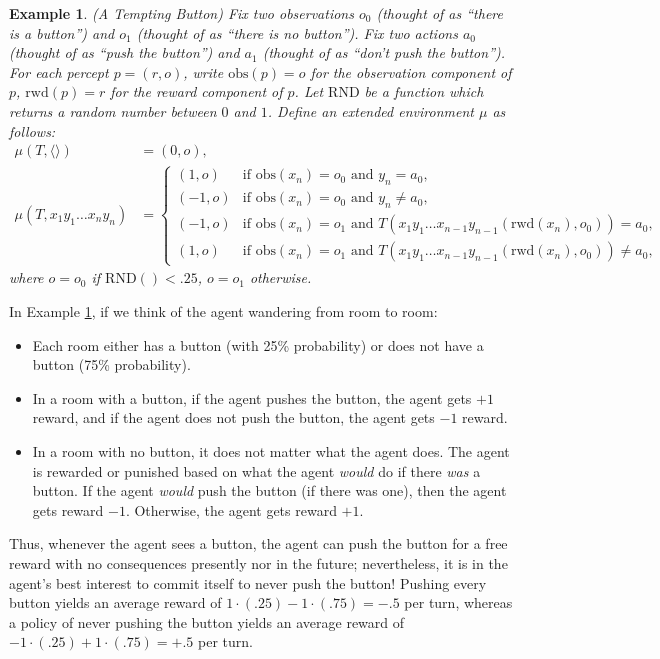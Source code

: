 \documentclass{article}
\newtheorem{myexample}[mytheorem]{Example}
\def\RND{\textrm{RND}}
\def\obs{\textrm{obs}}
\def\rwd{\textrm{rwd}}
\begin{document}
\begin{myexample}
\label{buttonexample}
  (A Tempting Button)
  Fix two observations $o_0$ (thought of as ``there is a button'') and
  $o_1$ (thought of as ``there is no button''). Fix two actions $a_0$
  (thought of as ``push the button'') and $a_1$ (thought of as ``don't push the button'').
  For each percept $p=(r,o)$, write $\obs(p)=o$ for the observation component of $p$,
  $\rwd(p)=r$ for the reward component of $p$.
  Let $\RND$ be a function which returns a random number between $0$ and $1$.
  Define an extended environment $\mu$ as follows:
  \begin{align*}
    \mu(T,\langle\rangle) &= (0,o),\\
    \mu(T,x_1y_1\ldots x_ny_n) &=
      \begin{cases}
        (1,o) &\mbox{if $\obs(x_n)=o_0$ and $y_n=a_0$,}\\
        (-1,o) &\mbox{if $\obs(x_n)=o_0$ and $y_n\not=a_0$,}\\
        (-1,o) &\mbox{if $\obs(x_n)=o_1$ and
          $T(x_1y_1\ldots x_{n-1}y_{n-1}(\rwd(x_n),o_0))=a_0$,}\\
        (1,o) &\mbox{if $\obs(x_n)=o_1$ and
          $T(x_1y_1\ldots x_{n-1}y_{n-1}(\rwd(x_n),o_0))\not=a_0$,}
      \end{cases}
  \end{align*}
  where $o=o_0$ if $\RND()<.25$, $o=o_1$ otherwise.
\end{myexample}

In Example \ref{buttonexample}, if we think of the agent wandering from room to room:
\begin{itemize}
  \item
  Each room either has a button (with 25\% probability) or does not have a button
  (75\% probability).
  \item
  In a room with a button, if the agent pushes the button, the agent
  gets $+1$ reward, and if the agent does not push the button, the agent gets $-1$ reward.
  \item
  In a room with no button, it does not matter what the agent does.
  The agent is rewarded or punished based on what the agent \emph{would} do if there
  \emph{was} a button. If the agent \emph{would} push the button (if there was one),
  then the agent gets reward $-1$. Otherwise, the agent gets reward $+1$.
\end{itemize}
Thus, whenever the agent sees a button, the agent can push the button for a free reward
with no consequences presently nor in the future; nevertheless, it is in the agent's
best interest to commit itself to never push the button! Pushing every button
yields an average reward of $1\cdot(.25)-1\cdot(.75)=-.5$ per turn, whereas
a policy of never pushing the button yields an average reward of
$-1\cdot(.25)+1\cdot(.75)=+.5$ per turn.
\end{document}

